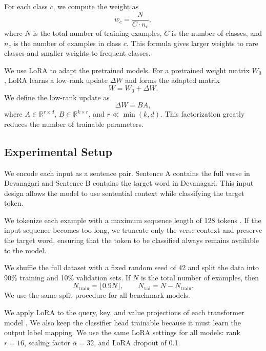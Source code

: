 \documentclass[conference]{IEEEtran}
\begin{document}
For each class $c$, we compute the weight as
\begin{equation}
w_c = \frac{N}{C \cdot n_c},
\end{equation}
where $N$ is the total number of training examples, $C$ is the number of classes, and $n_c$ is the number of examples in class $c$. This formula gives larger weights to rare classes and smaller weights to frequent classes.

We use LoRA \cite{hu2022lora} to adapt the pretrained models. For a pretrained weight matrix $W_0$, LoRA learns a low-rank update $\Delta W$ and forms the adapted matrix
\begin{equation}
W = W_0 + \Delta W.
\end{equation}
We define the low-rank update as
\begin{equation}
\Delta W = BA,
\end{equation}
where $A \in \mathbb{R}^{r \times d}$, $B \in \mathbb{R}^{k \times r}$, and $r \ll \min(k,d)$. This factorization greatly reduces the number of trainable parameters.

\subsection{Experimental Setup}
We encode each input as a sentence pair. Sentence A contains the full verse in Devanagari and Sentence B contains the target word in Devanagari. This input design allows the model to use sentential context while classifying the target token.

We tokenize each example with a maximum sequence length of 128 tokens \cite{wolf2020transformers}. If the input sequence becomes too long, we truncate only the verse context and preserve the target word, ensuring that the token to be classified always remains available to the model.

We shuffle the full dataset with a fixed random seed of 42 and split the data into 90\% training and 10\% validation sets. If $N$ is the total number of examples, then
\begin{equation}
N_{\text{train}} = \lfloor 0.9N \rfloor, \qquad N_{\text{val}} = N - N_{\text{train}}.
\end{equation}
We use the same split procedure for all benchmark models.

We apply LoRA to the query, key, and value projections of each transformer model \cite{hu2022lora}. We also keep the classifier head trainable because it must learn the output label mapping. We use the same LoRA settings for all models: rank $r = 16$, scaling factor $\alpha = 32$, and LoRA dropout of 0.1.
\end{document}
